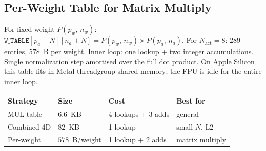 \documentclass[12pt]{article}
\theoremstyle{definition}
\theoremstyle{remark}
\newcommand{\Phib}[2]{P(#1,\,#2)}
\begin{document}
\subsection*{Per-Weight Table for Matrix Multiply}
For fixed weight $\Phib{p_w}{n_w}$:
$\mathtt{W\_TABLE}[p_a{+}N][n_a{+}N]=\Phib{p_w}{n_w}\times\Phib{p_a}{n_a}$.
For $N_\text{act}=8$: $289$ entries, $578$~B per weight.
Inner loop: one lookup + two integer accumulations.
Single normalization step amortised over the full dot product.
On Apple Silicon this table fits in Metal threadgroup shared memory;
the FPU is idle for the entire inner loop.
\begin{center}
\renewcommand{\arraystretch}{1.2}
\begin{tabular}{llll}
\toprule
Strategy & Size & Cost & Best for \\
\midrule
MUL table     & $6.6$~KB & 4 lookups + 3 adds & general \\
Combined 4D   & $82$~KB  & 1 lookup           & small $N$, L2 \\
Per-weight    & $578$~B/weight & 1 lookup + 2 adds & matrix multiply \\
\bottomrule
\end{tabular}
\end{center}
\end{document}

